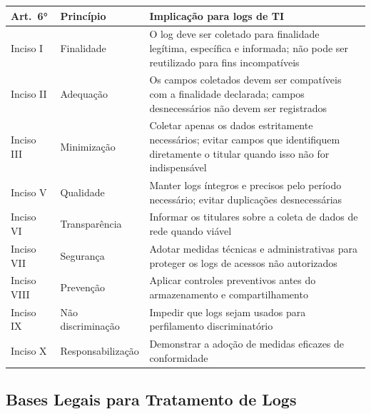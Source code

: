 \begin{quadro}[htb]
    \caption{\label{qdr:principios-logs}Princípios da LGPD e implicações para logs de infraestrutura}
    \begin{tabular}{|p{2.2cm}|p{2.8cm}|p{8.8cm}|}
        \hline
        \textbf{Art.\ 6°} & \textbf{Princípio} & \textbf{Implicação para logs de TI} \\
        \hline
        Inciso I   & Finalidade     & O log deve ser coletado para finalidade legítima, específica e informada; não pode ser reutilizado para fins incompatíveis \\
        \hline
        Inciso II  & Adequação      & Os campos coletados devem ser compatíveis com a finalidade declarada; campos desnecessários não devem ser registrados \\
        \hline
        Inciso III & Minimização    & Coletar apenas os dados estritamente necessários; evitar campos que identifiquem diretamente o titular quando isso não for indispensável \\
        \hline
        Inciso V   & Qualidade      & Manter logs íntegros e precisos pelo período necessário; evitar duplicações desnecessárias \\
        \hline
        Inciso VI  & Transparência  & Informar os titulares sobre a coleta de dados de rede quando viável \\
        \hline
        Inciso VII & Segurança      & Adotar medidas técnicas e administrativas para proteger os logs de acessos não autorizados \\
        \hline
        Inciso VIII& Prevenção      & Aplicar controles preventivos antes do armazenamento e compartilhamento \\
        \hline
        Inciso IX  & Não discriminação & Impedir que logs sejam usados para perfilamento discriminatório \\
        \hline
        Inciso X   & Responsabilização & Demonstrar a adoção de medidas eficazes de conformidade \\
        \hline
    \end{tabular}
\end{quadro}

\subsection{Bases Legais para Tratamento de Logs}
\label{subsec:bases-legais}

